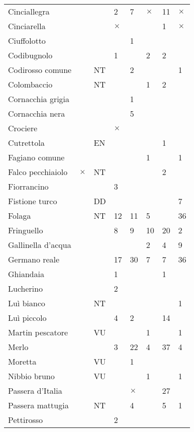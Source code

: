 \documentclass[11pt,a4paper,twoside]{memoir}
\begin{document}
\begin{longtable}{ll|l|l|l|l|l|l}
  Cinciallegra  &   &   & 2 & 7 & $\times$ & 11  & $\times$ \\
  Cinciarella &   &   & $\times$ &   &   & 1 & $\times$ \\
  Ciuffolotto &   &   &   & 1 &   &   &   \\
  Codibugnolo &   &   & 1 &   & 2 & 2 &   \\
  Codirosso comune  &   & NT  &   & 2 &   &   & 1 \\
  Colombaccio &   & NT  &   &   & 1 & 2 &   \\
  Cornacchia grigia &   &   &   & 1 &   &   &   \\
  Cornacchia nera &   &   &   & 5 &   &   &   \\
  Crociere  &   &   & $\times$ &   &   &   &   \\
  Cutrettola  &   & EN  &   &   &   & 1 &   \\
  Fagiano comune  &   &   &   &   & 1 &   & 1 \\
  Falco pecchiaiolo & $\times$ & NT  &   &   &   & 2 &   \\
  Fiorrancino &   &   & 3 &   &   &   &   \\
  Fistione turco  &   & DD  &   &   &   &   & 7 \\
  Folaga  &   & NT  & 12  & 11  & 5 &   & 36  \\
  Fringuello  &   &   & 8 & 9 & 10  & 20  & 2 \\
  Gallinella d'acqua  &   &   &   &   & 2 & 4 & 9 \\
  Germano reale &   &   & 17  & 30  & 7 & 7 & 36  \\
  Ghiandaia &   &   & 1 &   &   & 1 &   \\
  Lucherino &   &   & 2 &   &   &   &   \\
  Luì bianco  &   & NT  &   &   &   &   & 1 \\
  Luì piccolo &   &   & 4 & 2 &   & 14  &   \\
  Martin pescatore  &   & VU  &   &   & 1 &   & 1 \\
  Merlo &   &   & 3 & 22  & 4 & 37  & 4 \\
  Moretta &   & VU  &   & 1 &   &   &   \\
  Nibbio bruno  &   & VU  &   &   & 1 &   & 1 \\
  Passera d'Italia  &   &   &   & $\times$ &   & 27  &   \\
  Passera mattugia  &   & NT  &   & 4 &   & 5 & 1 \\
  Pettirosso  &   &   & 2 &   &   &   &   \\

\end{longtable}
\end{document}
